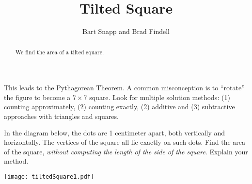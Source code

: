 \documentclass[nooutcomes]{ximera}
\title{Tilted Square}
\author{Bart Snapp and Brad Findell}
\begin{document}
\begin{abstract}
  We find the area of a tilted square.
\end{abstract}
\maketitle


\begin{teachingnote}
This leads to the Pythagorean Theorem.  A common misconception is to ``rotate'' the figure to become a $7\times 7$ square.  Look for multiple solution methods:  (1) counting approximately, (2) counting exactly, (2) additive and (3) subtractive approaches with triangles and squares.
\end{teachingnote}

\begin{problem}
In the diagram below, the dots are 1 centimeter apart, both vertically and horizontally.  The vertices of the square all lie exactly on such dots. Find the area of the square, \emph{without computing the length of the side of the square}.  Explain your method.  

\begin{image}
\texttt{[image: tiltedSquare1.pdf]}
\end{image}
\vfill
\end{problem}
\end{document}
